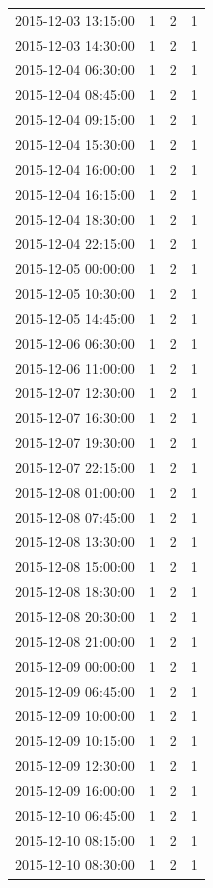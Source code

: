 \begin{tabular}{lrrr}
2015-12-03 13:15:00 & 1 & 2 & 1 \\
2015-12-03 14:30:00 & 1 & 2 & 1 \\
2015-12-04 06:30:00 & 1 & 2 & 1 \\
2015-12-04 08:45:00 & 1 & 2 & 1 \\
2015-12-04 09:15:00 & 1 & 2 & 1 \\
2015-12-04 15:30:00 & 1 & 2 & 1 \\
2015-12-04 16:00:00 & 1 & 2 & 1 \\
2015-12-04 16:15:00 & 1 & 2 & 1 \\
2015-12-04 18:30:00 & 1 & 2 & 1 \\
2015-12-04 22:15:00 & 1 & 2 & 1 \\
2015-12-05 00:00:00 & 1 & 2 & 1 \\
2015-12-05 10:30:00 & 1 & 2 & 1 \\
2015-12-05 14:45:00 & 1 & 2 & 1 \\
2015-12-06 06:30:00 & 1 & 2 & 1 \\
2015-12-06 11:00:00 & 1 & 2 & 1 \\
2015-12-07 12:30:00 & 1 & 2 & 1 \\
2015-12-07 16:30:00 & 1 & 2 & 1 \\
2015-12-07 19:30:00 & 1 & 2 & 1 \\
2015-12-07 22:15:00 & 1 & 2 & 1 \\
2015-12-08 01:00:00 & 1 & 2 & 1 \\
2015-12-08 07:45:00 & 1 & 2 & 1 \\
2015-12-08 13:30:00 & 1 & 2 & 1 \\
2015-12-08 15:00:00 & 1 & 2 & 1 \\
2015-12-08 18:30:00 & 1 & 2 & 1 \\
2015-12-08 20:30:00 & 1 & 2 & 1 \\
2015-12-08 21:00:00 & 1 & 2 & 1 \\
2015-12-09 00:00:00 & 1 & 2 & 1 \\
2015-12-09 06:45:00 & 1 & 2 & 1 \\
2015-12-09 10:00:00 & 1 & 2 & 1 \\
2015-12-09 10:15:00 & 1 & 2 & 1 \\
2015-12-09 12:30:00 & 1 & 2 & 1 \\
2015-12-09 16:00:00 & 1 & 2 & 1 \\
2015-12-10 06:45:00 & 1 & 2 & 1 \\
2015-12-10 08:15:00 & 1 & 2 & 1 \\
2015-12-10 08:30:00 & 1 & 2 & 1 \\

\end{tabular}
